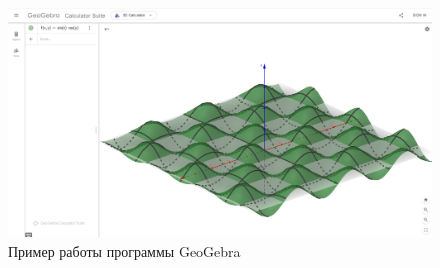 \begin{figure}[h!]
    \center
    \includegraphics[scale=0.35]{fig/GeoBebra.png}
    \caption{Пример работы программы GeoGebra}
    \label{fig:24}
\end{figure}